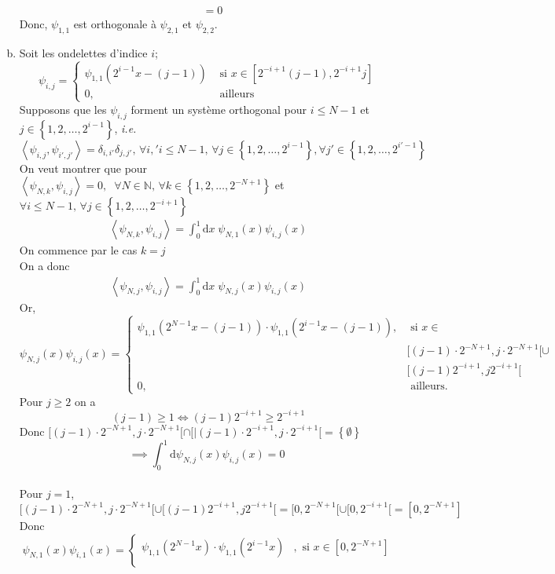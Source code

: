 \documentclass[letterpaper,12pt,oneside,final]{book}
\begin{document}
\begin{enumerate}[a)]
\begin{equation*}
\begin{split}
& = 0
\end{split}
\end{equation*}
Donc, \( \psi_{1,1}\) est orthogonale à \( \psi_{2,1} \) et \( \psi_{2,2} \).
\item %
Soit les ondelettes d'indice \( i \); 
\[ \psi_{i,j} = \begin{cases}
    \psi_{1,1}(2^{i-1}x-(j-1)) & \text{ si } x\in [2^{-i+1}(j-1),2^{-i+1}j]\\ 
    0, & \text{ ailleurs }
\end{cases} \]
Supposons que les \( \psi_{i,j} \) forment un système orthogonal pour \( i\leq N-1 \) et \( j \in \left\{ 1,2,\ldots,2^{i-1} \right\}  \), 
\textit{i.e.} \( \left<\psi_{i,j} , \psi_{i',j'} \right> = \delta_{i,i'}\delta_{j,j'},\, \forall i,'i \leq N-1,\, \forall j\in 
\left\{ 1,2,\ldots,2^{i-1}\right\}, \forall j' \in \left\{ 1,2,\ldots,2^{i'-1} \right\}   \)
\\
On veut montrer que pour \( \left<\psi_{N,k}, \psi_{i,j} \right> = 0,\;\; \forall N\in \mathbb{N},\, \forall k\in \left\{1,2,\ldots,2^{-N+1} \right\}   \) et \( \forall i \leq N-1,\, \forall j \in \left\{1,2,\ldots,2^{-i+1} \right\}  \)\\
\begin{equation*}
\begin{split}
    \left< \psi_{N,k}, \psi_{i,j} \right> = \int_{0}^{1}\text{d}x\; \psi_{N,1}(x) \psi_{i,j}(x)
\end{split}
\end{equation*}
On commence par le cas \( k = j \)
\\ 
On a donc 
\begin{equation*}
\begin{split}
    \left<\psi_{N,j}, \psi_{i,j} \right> = \int_{0}^{1}\text{d}x\; \psi_{N,j}(x) \psi_{i,j}(x) 
\end{split}
\end{equation*}
Or, 
\[ \psi_{N,j}(x) \psi_{i,j}(x) = \begin{cases}
    \psi_{1,1}(2^{N-1}x-(j-1))\cdot \psi_{1,1}(2^{i-1}x-(j-1)), & \text{ si } x\in \\ 
   &  [(j-1)\cdot 2^{-N+1},j\cdot 2^{-N+1}[\cup\\ & [(j-1)2^{-i+1},j2^{-i+1}[\\ 
    0, & \text{ ailleurs.}
\end{cases} \]
Pour \( j\geq   2 \) on a 
\[ (j-1) \geq   1 \iff (j-1)2^{-i+1} \geq   2^{-i+1}\]
Donc \( [(j-1)\cdot 2^{-N+1},j\cdot 2^{-N+1}[\cap[|(j-1)\cdot 2^{-i+1},j\cdot 2^{-i+1}[ = \left\{ \emptyset \right\}  \)
\[ \implies \int_{0}^{1}\text{d} \psi_{N,j}(x) \psi_{i,j}(x) = 0\; \]
\\ 
Pour \( j=1 \),
\[ [(j-1)\cdot 2^{-N+1},j\cdot 2^{-N+1}[\cup[(j-1)2^{-i+1},j2^{-i+1}[ = [0,2^{-N+1}[\cup[0,2^{-i+1}[ = [0,2^{-N+1}]\]
Donc 
\[ \psi_{N,1}(x)\psi_{i,1}(x) =  \begin{cases}
    \psi_{1,1}(2^{N-1}x)\cdot \psi_{1,1}(2^{i-1}x) &, \text{ si } x\in [0,2^{-N+1}]\\ 


\end{cases}\]
\end{enumerate}
\end{document}
